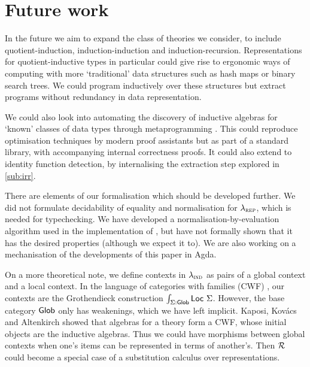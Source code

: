 
\section{Future work}


In the future we aim to expand the class of theories we consider, to include
quotient-induction, induction-induction and induction-recursion. Representations
for quotient-inductive types in particular could give rise to ergonomic ways of
computing with more `traditional' data structures such as hash maps or binary
search trees. We could program inductively over these structures but extract
programs without redundancy in data representation.

We could also look into automating the discovery of inductive algebras for
`known' classes of data types through metaprogramming \cite{Dagand2017-nj}. This
could reproduce optimisation techniques by modern proof assistants but as
part of a standard library, with accompanying internal correctness proofs. It
could also extend to identity function detection, by internalising the
extraction step explored in \cref{sub:irr}.

There are elements of our formalisation which should be developed further. We
did not formulate decidability of equality and normalisation for $\lambda_{\textsc{rep}}$,
which is needed for typechecking. We have developed a
normalisation-by-evaluation \cite{Altenkirch2020-rm} algorithm used in the
implementation of \superfluid, but have not formally shown that it has the
desired properties (although we expect it to). We are also working on a
mechanisation of the developments of this paper in Agda.



On a more theoretical note, we define contexts in $\lambda_{\textsc{ind}}$ as pairs of a
global context and a local context. In the language of categories with
families (CWF) \cite{Castellan2019-qo}, our contexts are the Grothendieck
construction $\int _{\Sigma : \textsf{Glob}} \textsf{Loc}\ \Sigma$. However, the base
category $\textsf{Glob}$ only has weakenings, which we have left implicit.
Kaposi, Kov\'acs and Altenkirch \cite{Kaposi2019-pj} showed that algebras for a
theory form a CWF, whose initial objects are the inductive algebras. Thus we
could have morphisms between global contexts when one's items can be represented
in terms of another's. Then $\mathcal{R}$ could become a special case of a substitution
calculus over representations.

